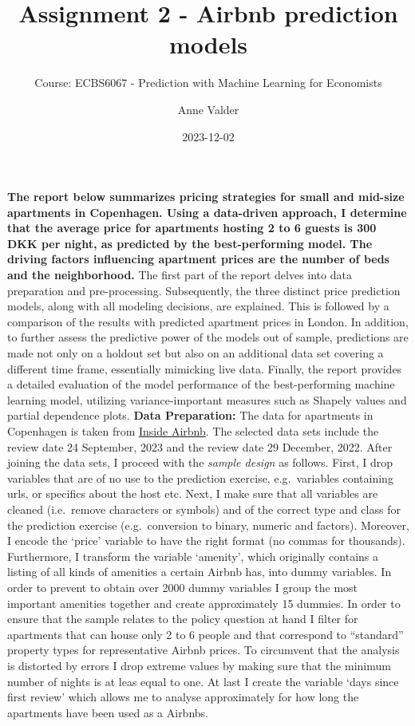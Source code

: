 \documentclass[
]{article}
\title{Assignment 2 - Airbnb prediction models}
\subtitle{Course: ECBS6067 - Prediction with Machine Learning for
Economists}
\author{Anne Valder}
\date{2023-12-02}
\begin{document}
\maketitle

\textbf{The report below summarizes pricing strategies for small and
mid-size apartments in Copenhagen. Using a data-driven approach, I
determine that the average price for apartments hosting 2 to 6 guests is
300 DKK per night, as predicted by the best-performing model. The
driving factors influencing apartment prices are the number of beds and
the neighborhood.} The first part of the report delves into data
preparation and pre-processing. Subsequently, the three distinct price
prediction models, along with all modeling decisions, are explained.
This is followed by a comparison of the results with predicted apartment
prices in London. In addition, to further assess the predictive power of
the models out of sample, predictions are made not only on a holdout set
but also on an additional data set covering a different time frame,
essentially mimicking live data. Finally, the report provides a detailed
evaluation of the model performance of the best-performing machine
learning model, utilizing variance-important measures such as Shapely
values and partial dependence plots. \textbf{Data Preparation:} The data
for apartments in Copenhagen is taken from
\href{http://insideairbnb.com/get-the-data/}{Inside Airbnb}. The
selected data sets include the review date 24 September, 2023 and the
review date 29 December, 2022. After joining the data sets, I proceed
with the \emph{sample design} as follows. First, I drop variables that
are of no use to the prediction exercise, e.g.~variables containing
urls, or specifics about the host etc. Next, I make sure that all
variables are cleaned (i.e.~remove characters or symbols) and of the
correct type and class for the prediction exercise (e.g.~conversion to
binary, numeric and factors). Moreover, I encode the `price' variable to
have the right format (no commas for thousands). Furthermore, I
transform the variable `amenity', which originally contains a listing of
all kinds of amenities a certain Airbnb has, into dummy variables. In
order to prevent to obtain over 2000 dummy variables I group the most
important amenities together and create approximately 15 dummies. In
order to ensure that the sample relates to the policy question at hand I
filter for apartments that can house only 2 to 6 people and that
correspond to ``standard'' property types for representative Airbnb
prices. To circumvent that the analysis is distorted by errors I drop
extreme values by making sure that the minimum number of nights is at
leas equal to one. At last I create the variable `days since first
review' which allows me to analyse approximately for how long the
apartments have been used as a Airbnbs.
\end{document}
